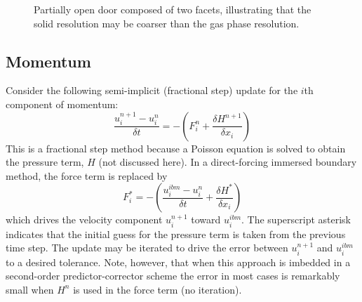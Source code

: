 \documentclass[12pt]{article}
\begin{document}
\begin{figure}
\begin{center}

\caption{Partially open door composed of two facets, illustrating that the solid resolution may be coarser than the gas phase resolution.}
\label{fig:opendoor}
\end{center}
\end{figure}


\subsection{Momentum}
\label{sec:momentum}

Consider the following semi-implicit (fractional step) update for the $i$th component of momentum:
\begin{equation}
\label{eqn:mom}
\frac{u_i^{n+1} - u_i^n}{\delta t} = -\left(F_i^n + \frac{\delta H^{n+1}}{\delta x_i}\right)
\end{equation}
This is a fractional step method because a Poisson equation is solved to obtain the pressure term, $H$ (not discussed here). In a direct-forcing immersed boundary method, the force term is replaced by
\begin{equation}
\label{eqn:force}
F_i^* = - \left( \frac{u_i^{ibm} - u_i^n}{\delta t} + \frac{\delta H^*}{\delta x_i}\right)
\end{equation}
which drives the velocity component $u_i^{n+1}$ toward $u_i^{ibm}$.  The superscript asterisk indicates that the initial guess for the pressure term is taken from the previous time step.  The update may be iterated to drive the error between $u_i^{n+1}$ and $u_i^{ibm}$ to a desired tolerance.  Note, however, that when this approach is imbedded in a second-order predictor-corrector scheme the error in most cases is remarkably small when $H^n$ is used in the force term (no iteration).
\end{document}
